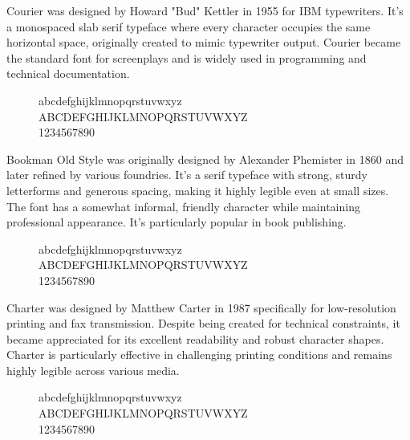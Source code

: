   \begin{example}[Courier]
    \label{ex:courier}
    Courier was designed by Howard "Bud" Kettler in 1955 for IBM typewriters. It's a monospaced slab serif typeface where every character occupies the same horizontal space, originally created to mimic typewriter output. Courier became the standard font for screenplays and is widely used in programming and technical documentation. 
    
    \begin{figure}[H]
      \selectfont
      \huge
      \raggedright
      abcdefghijklmnopqrstuvwxyz \\
      ABCDEFGHIJKLMNOPQRSTUVWXYZ \\
      1234567890
    \end{figure}
  \end{example}

  \begin{example}[Bookman]
    \label{ex:bookman}
    Bookman Old Style was originally designed by Alexander Phemister in 1860 and later refined by various foundries. It's a serif typeface with strong, sturdy letterforms and generous spacing, making it highly legible even at small sizes. The font has a somewhat informal, friendly character while maintaining professional appearance. It's particularly popular in book publishing. 
    
    \begin{figure}[H]
      \selectfont
      \huge
      \raggedright
      abcdefghijklmnopqrstuvwxyz \\
      ABCDEFGHIJKLMNOPQRSTUVWXYZ \\
      1234567890
    \end{figure}
  \end{example}

  \begin{example}[Charter]
    \label{ex:charter}
    Charter was designed by Matthew Carter in 1987 specifically for low-resolution printing and fax transmission. Despite being created for technical constraints, it became appreciated for its excellent readability and robust character shapes. Charter is particularly effective in challenging printing conditions and remains highly legible across various media. 
    
    \begin{figure}[H]
      \selectfont
      \huge
      \raggedright
      abcdefghijklmnopqrstuvwxyz \\
      ABCDEFGHIJKLMNOPQRSTUVWXYZ \\
      1234567890
    \end{figure}
  \end{example}
  
